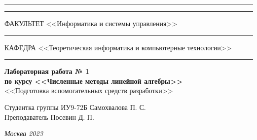 \documentclass[a4paper, 14pt]{extarticle}
\begin{document}
\begin{titlepage}
\vspace{-25pt}
\hspace{-35pt}\rule{\textwidth}{2.3pt}

\vspace*{-20.3pt}
\hspace{-35pt}\rule{\textwidth}{0.4pt}

\vspace{1.5ex}
\hspace{-35pt} \noindent \small ФАКУЛЬТЕТ\hspace{80pt} <<Информатика и системы управления>>

\vspace*{-16pt}
\hspace{47pt}\rule{0.83\textwidth}{0.4pt}

\vspace{0.5ex}
\hspace{-35pt} \noindent \small КАФЕДРА\hspace{50pt} <<Теоретическая информатика и компьютерные технологии>>

\vspace*{-16pt}
\hspace{30pt}\rule{0.866\textwidth}{0.4pt}
  
\vspace{11em}

\begin{center}
\Large {\bf Лабораторная работа № 1} \\
\large {\bf по курсу <<Численные методы линейной алгебры>>} \\
\large <<Подготовка вспомогательных средств разработки>>
\end{center}\normalsize

\vspace{8em}


\begin{flushright}
  {Студентка группы ИУ9-72Б Самохвалова П. С. \hspace*{15pt}\\
  \vspace{2ex}
  Преподаватель Посевин Д. П.\hspace*{15pt}}
\end{flushright}

\bigskip

\vfill
 

\begin{center}
\textsl{Москва 2023}
\end{center}
\end{titlepage}
\end{document}
